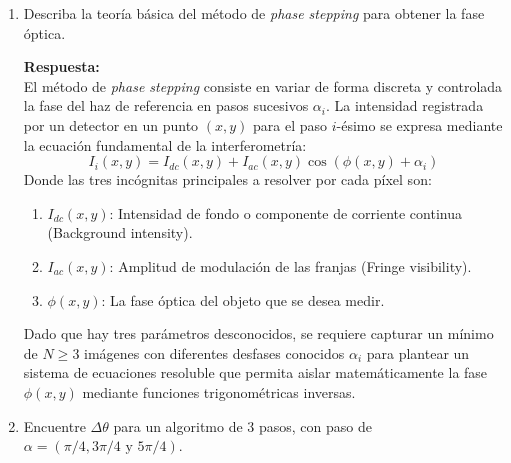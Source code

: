 \documentclass[12pt,letterpaper]{article}
\begin{document}
\begin{enumerate}
		\item[2.-] Describa la teoría básica del método de \textit{phase stepping} para obtener la fase óptica.
		
		\vspace{0.3cm}
		\textbf{Respuesta:} \\
		El método de \textit{phase stepping} consiste en variar de forma discreta y controlada la fase del haz de referencia en pasos sucesivos $\alpha_i$. La intensidad registrada por un detector en un punto $(x,y)$ para el paso $i$-ésimo se expresa mediante la ecuación fundamental de la interferometría:
		\[ I_i(x,y) = I_{dc}(x,y) + I_{ac}(x,y) \cos(\phi(x,y) + \alpha_i) \]
		Donde las tres incógnitas principales a resolver por cada píxel son:
		\begin{enumerate}
			\item $I_{dc}(x,y)$: Intensidad de fondo o componente de corriente continua (Background intensity).
			\item $I_{ac}(x,y)$: Amplitud de modulación de las franjas (Fringe visibility).
			\item $\phi(x,y)$: La fase óptica del objeto que se desea medir.
		\end{enumerate}
		Dado que hay tres parámetros desconocidos, se requiere capturar un mínimo de $N \ge 3$ imágenes con diferentes desfases conocidos $\alpha_i$ para plantear un sistema de ecuaciones resoluble que permita aislar matemáticamente la fase $\phi(x,y)$ mediante funciones trigonométricas inversas.
		\vspace{0.5cm}
		
		\item[3.-] Encuentre $\Delta\theta$ para un algoritmo de 3 pasos, con paso de $\alpha = (\pi/4, 3\pi/4 \text{ y } 5\pi/4)$.
		

\end{enumerate}
\end{document}
